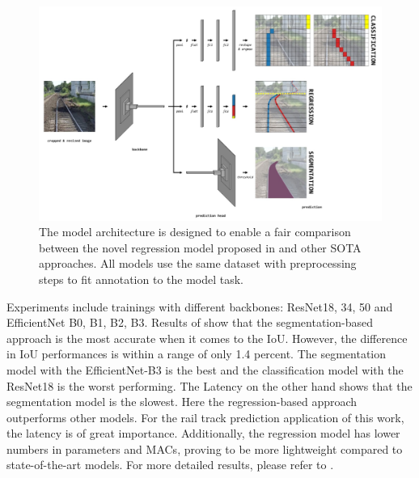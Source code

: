 \begin{figure}[H]
    \centering
    \includegraphics[width=\linewidth]{PICs/Baselinepaper/tep-net_sota_models.jpg}
    \caption{The model architecture is designed to enable a fair comparison between the novel regression model proposed in \cite{tepNet2024} and other \ac{SOTA} approaches.
    All models use the same dataset with preprocessing steps to fit annotation to the model task.}
    \label{fig:TEP-Net_sota_models}
\end{figure}

Experiments include trainings with different backbones: ResNet18, 34, 50 and EfficientNet B0, B1, B2, B3.
Results of \cite{tepNet2024} show that the segmentation-based approach is the most accurate when it comes to the \ac{IoU}.
However, the difference in \ac{IoU} performances is within a range of only 1.4 percent.
The segmentation model with the EfficientNet-B3 is the best and the classification model with the ResNet18 is the worst performing.
The Latency on the other hand shows that the segmentation model is the slowest.
Here the regression-based approach outperforms other models.
For the rail track prediction application of this work, the latency is of great importance.
Additionally, the regression model has lower numbers in parameters and \ac{MACs}, proving to be more lightweight compared to state-of-the-art models.
For more detailed results, please refer to \cite{tepNet2024}.

